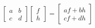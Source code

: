 \documentclass[preview]{standalone}
\begin{document}
\begin{align*}
\begin{bmatrix} a & b \\ c & d \end{bmatrix}\begin{bmatrix} f \\ h \end{bmatrix} = \begin{bmatrix} af + bh \\ cf + dh \end{bmatrix}
\end{align*}
\end{document}

